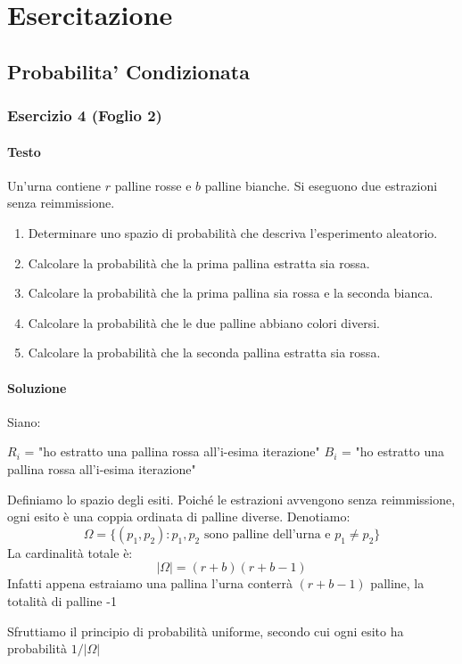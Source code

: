 % 
\chapter{Esercitazione}
\section{Probabilita' Condizionata}
\subsection{Esercizio 4 (Foglio 2)}
\subsubsection{Testo}
Un’urna contiene \(r\) palline rosse e \(b\) palline bianche. Si eseguono due estrazioni senza reimmissione.
\begin{enumerate}[label=(\alph*)]
    \item Determinare uno spazio di probabilità che descriva l’esperimento aleatorio.
    \item Calcolare la probabilità che la prima pallina estratta sia rossa.
    \item Calcolare la probabilità che la prima pallina sia rossa e la seconda bianca.
    \item Calcolare la probabilità che le due palline abbiano colori diversi.
    \item Calcolare la probabilità che la seconda pallina estratta sia rossa.
\end{enumerate}

\subsubsection{Soluzione}
Siano:

$R_i$ = "ho estratto una pallina rossa all'i-esima iterazione"
$B_i$ = "ho estratto una pallina rossa all'i-esima iterazione"

Definiamo lo spazio degli esiti. Poiché le estrazioni avvengono senza reimmissione, ogni esito è una coppia ordinata di palline diverse. Denotiamo:
\[
    \Omega = \{ (p_1, p_2) : p_1, p_2 \text{ sono palline dell'urna e } p_1 \neq p_2 \}
\]
La cardinalità totale è:
\[
    |\Omega| = (r+b)(r+b-1)
\]
Infatti appena estraiamo una pallina l'urna conterrà $(r+b-1)$ palline, la totalità di palline -1

Sfruttiamo il principio di probabilità uniforme, secondo cui ogni esito ha probabilità \(1/|\Omega|\)

